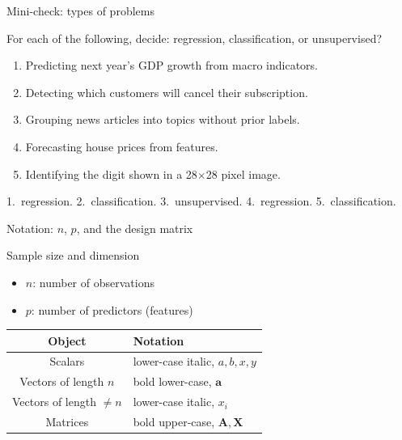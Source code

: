 \documentclass[aspectratio=169,11pt]{beamer}
\begin{document}
\begin{frame}{Mini-check: types of problems}
  \begin{readme}
    For each of the following, decide: regression, classification, or
    unsupervised?
    \begin{enumerate}
      \item Predicting next year's GDP growth from macro indicators.
      \item Detecting which customers will cancel their subscription.
      \item Grouping news articles into topics without prior labels.
      \item Forecasting house prices from features.
      \item Identifying the digit shown in a 28$\times$28 pixel image.
    \end{enumerate}
  \end{readme}
  \begin{takeaway}[Answers]
    1.\ regression. 2.\ classification. 3.\ unsupervised. 4.\ regression.
    5.\ classification.
  \end{takeaway}
\end{frame}



\begin{frame}{Notation: $n$, $p$, and the design matrix}
  \begin{block}{Sample size and dimension}
    \begin{itemize}
      \item $n$: number of observations
      \item $p$: number of predictors (features)
    \end{itemize}
  \end{block}
  \begin{readme}
    \begin{tabular}{@{}cl@{}}
      \toprule
      \textbf{Object} & \textbf{Notation} \\
      \midrule
      Scalars & lower-case italic, $a, b, x, y$ \\
      Vectors of length $n$ & bold lower-case, $\mathbf{a}$ \\
      Vectors of length $\ne n$ & lower-case italic, $x_i$ \\
      Matrices & bold upper-case, $\mathbf{A}, \mathbf{X}$ \\
      \bottomrule
    \end{tabular}
  \end{readme}
\end{frame}
\end{document}
